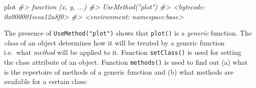 \documentclass[
]{book}
\newenvironment{Shaded}{\begin{snugshade}}{\end{snugshade}}
\newcommand{\CommentTok}[1]{\textcolor[rgb]{0.56,0.35,0.01}{\textit{#1}}}
\newcommand{\NormalTok}[1]{#1}
\begin{document}
\begin{Shaded}
\begin{Highlighting}[]
\NormalTok{plot}
\CommentTok{\#\textgreater{} function (x, y, ...) }
\CommentTok{\#\textgreater{} UseMethod("plot")}
\CommentTok{\#\textgreater{} \textless{}bytecode: 0x000001ecea12a8f0\textgreater{}}
\CommentTok{\#\textgreater{} \textless{}environment: namespace:base\textgreater{}}
\end{Highlighting}
\end{Shaded}

The presence of \texttt{UseMethod("plot")} shows that \texttt{plot()} is a \emph{{generic}} function. The \emph{{class}} of an object determines how it will be treated by a generic function i.e.~what \emph{{method}} will be applied to it. Function \texttt{setClass()} is used for setting the class attribute of an object. Function \texttt{methods()} is used to find out (a) what is the repertoire of methods of a generic function and (b) what methods are available for a certain class:
\end{document}
